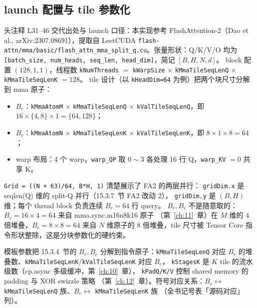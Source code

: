 \subsection{launch 配置与 tile 参数化}

头注释 L31--46 交代出处与 launch 口径：本实现参考 FlashAttention-2（Dao
et al., arXiv:2307.08691），提取自 LeetCUDA
\texttt{flash-attn/mma/basic/flash\_attn\_mma\_split\_q.cu}。张量形状：Q/K/V/O
均为 \texttt{[batch\_size, num\_heads, seq\_len, head\_dim]}，简记 $[B, H, N, d]$。
block 配置 $(128, 1, 1)$，线程数 \texttt{kNumThreads} $=$ \texttt{kWarpSize}
$\times$ \texttt{kMmaTileSeqLenQ} $\times$ \texttt{kMmaTileSeqLenK} $= 128$。
tile 设计（以 \texttt{kHeadDim=64} 为例）把两个块尺寸分解到 mma 原子：
\begin{itemize}
  \item $B_r$：\texttt{kMmaAtomM} $\times$ \texttt{kMmaTileSeqLenQ} $\times$
        \texttt{kValTileSeqLenQ}，即 $16 \times \{4, 8\} \times 1 = \{64, 128\}$；
  \item $B_c$：\texttt{kMmaAtomN} $\times$ \texttt{kMmaTileSeqLenK} $\times$
        \texttt{kValTileSeqLenK}，即 $8 \times 1 \times 8 = 64$；
  \item warp 布局：4 个 warp，\texttt{warp\_QP} 取 $0 \sim 3$ 各处理 16 行
        Q，\texttt{warp\_KV} $= 0$ 共享 K。
\end{itemize}

\texttt{Grid = ((N + 63)/64,\ B*H,\ 1)} 清楚展示了 FA2 的两层并行：
\texttt{gridDim.x} 是 seqlen(Q) 维的 split-Q 并行（15.3.7~节 FA2 改动 2），
\texttt{gridDim.y} 是 $(B, H)$ 维；每个 thread block 负责连续 $B_r = 64$ 行 query。
$B_r, B_c$ 不是随意取的：$B_r = 16 \times 4 = 64$ 来自 mma.sync.m16n8k16 原子
（第~\ref{ch:11}~章）在 $M$ 维的 $4$ 倍堆叠，$B_c = 8 \times 8 = 64$ 来自 $N$ 维原子的
$8$ 倍堆叠，tile 尺寸被 Tensor Core 指令形状整除，这是分块参数化的硬约束。



模板参数把 15.3.4~节的 $B_r, B_c$ 分解到指令原子：\texttt{k\allowbreak{}Mma\allowbreak{}Tile\allowbreak{}Seq\allowbreak{}Len\allowbreak{}Q} 对应
$B_r$ 的堆叠数、\texttt{k\allowbreak{}Mma\allowbreak{}Tile\allowbreak{}Seq\allowbreak{}Len\allowbreak{}K}/\texttt{k\allowbreak{}Val\allowbreak{}Tile\allowbreak{}Seq\allowbreak{}Len\allowbreak{}K} 对应 $B_c$，
\texttt{kStagesK} 是 $K$ tile 的流水级数（cp.async 多级缓冲，第~\ref{ch:10}~章），
\texttt{kPadQ/K/V} 控制 shared memory 的 padding 与 XOR swizzle 策略
（第~\ref{ch:12}~章）。符号对应关系：$B_r \leftrightarrow$
\texttt{k\allowbreak{}Mma\allowbreak{}Tile\allowbreak{}Seq\allowbreak{}Len\allowbreak{}Q} 族、$B_c \leftrightarrow$ \texttt{k\allowbreak{}Mma\allowbreak{}Tile\allowbreak{}Seq\allowbreak{}Len\allowbreak{}K} 族
（全书记号表「源码对应」列）。

